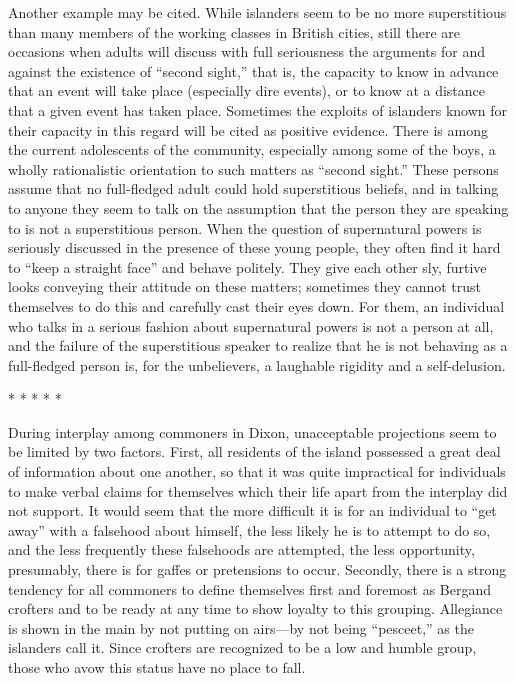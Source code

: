 \documentclass[twoside,symmetric,nobib,justified]{tufte-book}
\begin{document}
Another example may be cited. While islanders seem to be no more
superstitious than many members of the working classes in British
cities, still there are occasions when adults will discuss with full
seriousness the arguments for and against the existence of ``second
sight,'' that is, the capacity to know in advance that an event will
take place (especially dire events), or to know at a distance that a
given event has taken place. Sometimes the exploits of islanders known
for their capacity in this regard will be cited as positive evidence.
There is among the current adolescents of the community, especially
among some of the boys, a wholly rationalistic orientation to such
matters as ``second sight.'' These persons assume that no full-fledged
adult could hold superstitious beliefs, and in talking to anyone they
seem to talk on the assumption that the person they are speaking to is
not a superstitious person. When the question of supernatural powers is
seriously discussed in the presence of these young people, they often
find it hard to ``keep a straight face'' and behave politely. They give
each other sly, furtive looks conveying their attitude on these matters;
sometimes they cannot trust themselves to do this and carefully cast
their eyes down. For them, an individual who talks in a serious fashion
about supernatural powers is not a person at all, and the failure of the
superstitious speaker to realize that he is not behaving as a
full-fledged person is, for the unbelievers, a laughable rigidity and a
self-delusion.

\vspace{.2in}
\begin{centering}

\Large{* * * * *}

\end{centering}
\vspace{.17in}

\noindent During interplay among commoners in Dixon, unacceptable projections seem
to be limited by two factors. First, all residents of the island
possessed a great deal of information about one another, so that it was
quite impractical for individuals to make verbal claims for themselves
which their life apart from the interplay did not support. It would seem
that the more difficult it is for an individual to ``get away'' with a
falsehood about himself, the less likely he is to attempt to do so, and
the less frequently these falsehoods are attempted, the less
opportunity, presumably, there is for gaffes or pretensions to occur.
Secondly, there is a strong tendency for all commoners to define
themselves first and foremost as Bergand crofters and to be ready at any
time to show loyalty to this grouping. Allegiance is shown in the main
by not putting on airs---by not being ``pesceet,'' as the islanders call
it. Since crofters are recognized to be a low and humble group, those
who avow this status have no place to fall.
\end{document}
